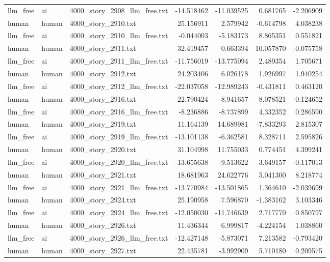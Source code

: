 \begin{longtable}{lllrrrr}
llm\_free & ai & 4000\_story\_2908\_llm\_free.txt & -14.518462 & -11.039525 & 0.681765 & -2.206909 \\
human & human & 4000\_story\_2910.txt & 25.156911 & 2.579942 & -0.614798 & 4.038238 \\
llm\_free & ai & 4000\_story\_2910\_llm\_free.txt & -0.044003 & -5.183173 & 8.865351 & 0.551821 \\
human & human & 4000\_story\_2911.txt & 32.419457 & 0.663394 & 10.057870 & -0.075758 \\
llm\_free & ai & 4000\_story\_2911\_llm\_free.txt & -11.756019 & -13.775094 & 2.489354 & 1.705671 \\
human & human & 4000\_story\_2912.txt & 24.203406 & 6.026178 & 1.926997 & 1.940254 \\
llm\_free & ai & 4000\_story\_2912\_llm\_free.txt & -22.037058 & -12.989243 & -0.431811 & 0.463120 \\
human & human & 4000\_story\_2916.txt & 22.790424 & -8.941657 & 8.078521 & -0.124652 \\
llm\_free & ai & 4000\_story\_2916\_llm\_free.txt & -8.236886 & -8.737899 & 4.332352 & 0.286590 \\
human & human & 4000\_story\_2919.txt & 11.164139 & 14.689981 & -7.833293 & 2.815307 \\
llm\_free & ai & 4000\_story\_2919\_llm\_free.txt & -13.101138 & -6.362581 & 8.328711 & 2.595826 \\
human & human & 4000\_story\_2920.txt & 31.104998 & 11.755033 & 0.774451 & 4.399241 \\
llm\_free & ai & 4000\_story\_2920\_llm\_free.txt & -13.655638 & -9.513622 & 3.649157 & -0.117013 \\
human & human & 4000\_story\_2921.txt & 18.681963 & 24.622776 & 5.041300 & 8.218774 \\
llm\_free & ai & 4000\_story\_2921\_llm\_free.txt & -13.770984 & -13.501865 & 1.364610 & -2.039699 \\
human & human & 4000\_story\_2924.txt & 25.190958 & 7.596870 & -1.383162 & 3.103346 \\
llm\_free & ai & 4000\_story\_2924\_llm\_free.txt & -12.050030 & -11.746639 & 2.717770 & 0.850797 \\
human & human & 4000\_story\_2926.txt & 11.436344 & 6.999817 & -4.224154 & 1.038860 \\
llm\_free & ai & 4000\_story\_2926\_llm\_free.txt & -12.427148 & -5.873071 & 7.213582 & -0.793420 \\
human & human & 4000\_story\_2927.txt & 22.435781 & -3.992909 & 5.710180 & 0.209575 \\

\end{longtable}
